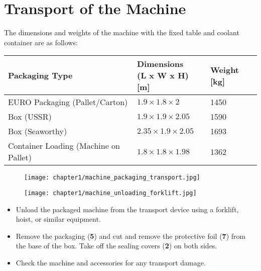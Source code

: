 
\section{Transport of the Machine}

The dimensions and weights of the machine with the fixed table and coolant container are as follows:

\begin{table}[h]
\centering
\begin{tabular}{lll}
\textbf{Packaging Type} & \makecell{\textbf{Dimensions}\\\textbf{(L x W x H) [m]}} & \textbf{Weight [kg]} \\ \hline
EURO Packaging (Pallet/Carton) & $1.9 \times 1.8 \times 2$ & 1450 \\
Box (USSR) & $1.9 \times 1.9 \times 2.05$ & 1590 \\
Box (Seaworthy) & $2.35 \times 1.9 \times 2.05$ & 1693 \\
Container Loading (Machine on Pallet) & $1.8 \times 1.8 \times 1.98$ & 1362 \\
\end{tabular}
\end{table}

\begin{figure}[h]
    \centering
    \begin{minipage}[b]{0.35\textwidth} %
        \centering
        \texttt{[image: chapter1/machine\_packaging\_transport.jpg]} %
        \caption{}
        \label{fig:packaging}
    \end{minipage}
    \hfill
    \begin{minipage}[b]{0.55\textwidth} %
        \centering
        \texttt{[image: chapter1/machine\_unloading\_forklift.jpg]} %
        \caption{}
        \label{fig:unloading}
    \end{minipage}
\end{figure}

\begin{itemize}
    \item Unload the packaged machine from the transport device using a forklift, hoist, or similar equipment.
    \item Remove the packaging (\textbf{5}) and cut and remove the protective foil (\textbf{7}) from the base of the box. Take off the sealing covers (\textbf{2}) on both sides.
    \item Check the machine and accessories for any transport damage.
\end{itemize}

